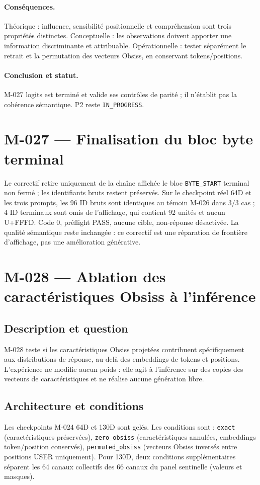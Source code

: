 \documentclass[11pt,a4paper]{report}
\begin{document}
\paragraph{Conséquences.} Théorique : influence, sensibilité positionnelle et compréhension sont trois propriétés distinctes. Conceptuelle : les observations doivent apporter une information discriminante et attribuable. Opérationnelle : tester séparément le retrait et la permutation des vecteurs Obsiss, en conservant tokens/positions.
\paragraph{Conclusion et statut.} M-027 logits est terminé et valide ses contrôles de parité ; il n'établit pas la cohérence sémantique. P2 reste \texttt{IN\_PROGRESS}.

\section{M-027 — Finalisation du bloc byte terminal}
\label{sec:m027-byte-finalization}
Le correctif retire uniquement de la chaîne affichée le bloc \texttt{BYTE\_START} terminal non fermé ; les identifiants bruts restent préservés. Sur le checkpoint réel 64D et les trois prompts, les 96 ID bruts sont identiques au témoin M-026 dans 3/3 cas ; 4 ID terminaux sont omis de l'affichage, qui contient 92 unités et aucun U+FFFD. Code 0, préflight PASS, aucune cible, non-réponse désactivée. La qualité sémantique reste inchangée : ce correctif est une réparation de frontière d'affichage, pas une amélioration générative.

\section{M-028 — Ablation des caractéristiques Obsiss à l'inférence}
\label{sec:m028-obsiss-feature-ablation}
\subsection{Description et question}
M-028 teste si les caractéristiques Obsiss projetées contribuent spécifiquement aux distributions de réponse, au-delà des embeddings de tokens et positions. L'expérience ne modifie aucun poids : elle agit à l'inférence sur des copies des vecteurs de caractéristiques et ne réalise aucune génération libre.
\subsection{Architecture et conditions}
Les checkpoints M-024 64D et 130D sont gelés. Les conditions sont : \texttt{exact} (caractéristiques préservées), \texttt{zero\_obsiss} (caractéristiques annulées, embeddings token/position conservés), \texttt{permuted\_obsiss} (vecteurs Obsiss inversés entre positions USER uniquement). Pour 130D, deux conditions supplémentaires séparent les 64 canaux collectifs des 66 canaux du panel sentinelle (valeurs et masques).
\end{document}
